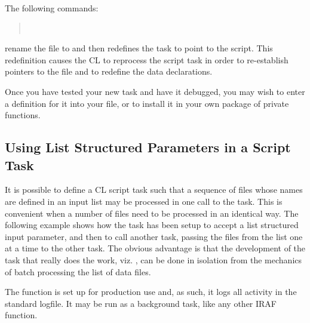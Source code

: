 The following commands:

\begin{quotation}\noindent
{}  \\
 
\end{quotation}

\noindent
rename the file  to 
and then redefines the  task to point to the script.
This redefinition causes the CL to reprocess the script task 
in order to re-establish pointers to the file and to
redefine the data declarations.  

Once you have tested your new task and have it 
debugged, you may wish to enter a  definition for
it into your  file, or to install it in your own 
package of private functions.

\subsection{Using List Structured Parameters in a Script Task}

It is possible to define a CL script task such that a sequence of files
whose names are defined in an input list
may be processed in one call to the task.  This is convenient
when a number of files need to be processed in an identical way.  The
following example shows how the task  has been
setup to accept a list structured input parameter, and then
to call another task, passing the files from the list one at a time
to the other task.  The obvious advantage is that the development
of the task that really does the work, viz. , can be done in 
isolation from the mechanics of batch processing the list of data files.

The  function is set up for production use and, 
as such, it logs all activity in the standard logfile. 
It may be run as a background task, like any other IRAF function.

